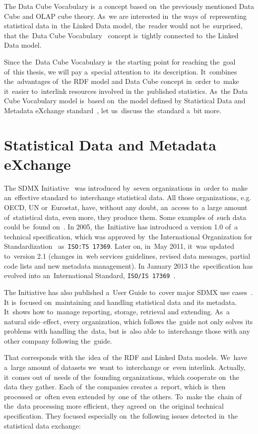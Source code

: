 The Data Cube Vocabulary is~a concept based on~the previously mentioned Data Cube and
OLAP cube theory. As~we are interested in~the ways of~representing statistical data in~the
Linked Data model, the~reader would not be~surprised, that the~Data Cube 
Vocabulary~\cite{dcv}
concept is~tightly connected to~the Linked Data model.

Since the~Data Cube Vocabulary is~the starting point for reaching the~goal of~this thesis,
we will pay a~special attention to~its description. It~combines the~advantages of~the RDF
model and Data Cube concept in~order to~make it~easier to~interlink resources involved
in the~published statistics. As~the Data Cube Vocabulary model is~based on~the model defined
by Statistical Data and Metadata eXchange standard~\cite{sdmx}, let us~discuss the~standard a~bit more.

\section{Statistical Data and Metadata eXchange}
The SDMX Initiative~\cite{sdmx} was introduced by~seven organizations in~order to~make
an~effective standard to~interchange statistical data. All those organizations, e.g. OECD,
UN or~Eurostat, have, without any doubt, an~access to~a large amount of~statistical data, even more,
they produce them. Some examples of~such data could be~found on~\cite{pubdata}.
In 2005, the~Initiative has introduced a
version 1.0 of~a technical specification, which was approved by~the International
Organization for Standardization~\cite{iso} as~\texttt{ISO:TS 17369}.
Later on, in~May 2011, it~was updated to~version 2.1 (changes in~web services guidelines,
revised data messages, partial code lists and new metadata management).
In January 2013 the~specification has evolved into an~International Standard,
\texttt{ISO/IS 17369}~\cite{isosdmx}.

The Initiative has also published a~User Guide to~cover major SDMX use cases~\cite{sdmxuserguide}.
It is~focused on~maintaining and handling statistical data and its metadata. It~shows
how to~manage reporting, storage, retrieval and extending. As~a natural side--effect,
every organization, which follows the~guide not only solves its problems with
handling the~data, but is~also able to~interchange those with any other company
following the~guide.

That corresponds with the~idea of~the RDF and Linked Data models. We~have a~large amount
of datasets we~want to~interchange or~even interlink. Actually, it~comes out of~needs
of the~founding organizations, which cooperate on~the data they gather. Each of~the companies creates
a~report, which is~then processed or~often even extended by~one of~the others. To~make the~chain
of the~data processing more efficient, they agreed on~the original technical specification.
They focused especially on~the following issues detected in~the statistical data exchange:

